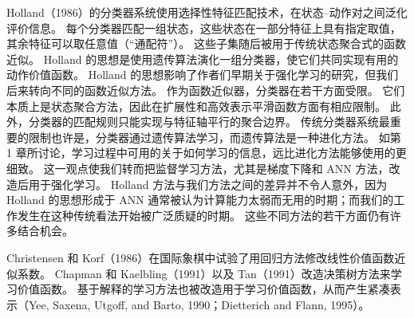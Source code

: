 \documentclass[UTF8, 12pt, fontset=fandol, oneside]{ctexart}
\begin{document}
Holland（1986）的分类器系统使用选择性特征匹配技术，在状态--动作对之间泛化评价信息。
每个分类器匹配一组状态，这些状态在一部分特征上具有指定取值，其余特征可以取任意值（“通配符”）。
这些子集随后被用于传统状态聚合式的函数近似。
Holland 的思想是使用遗传算法演化一组分类器，使它们共同实现有用的动作价值函数。
Holland 的思想影响了作者们早期关于强化学习的研究，但我们后来转向不同的函数近似方法。
作为函数近似器，分类器在若干方面受限。
它们本质上是状态聚合方法，因此在扩展性和高效表示平滑函数方面有相应限制。
此外，分类器的匹配规则只能实现与特征轴平行的聚合边界。
传统分类器系统最重要的限制也许是，分类器通过遗传算法学习，而遗传算法是一种进化方法。
如第 1 章所讨论，学习过程中可用的关于如何学习的信息，远比进化方法能够使用的更细致。
这一观点使我们转而把监督学习方法，尤其是梯度下降和 ANN 方法，改造后用于强化学习。
Holland 方法与我们方法之间的差异并不令人意外，因为 Holland 的思想形成于 ANN 通常被认为计算能力太弱而无用的时期；而我们的工作发生在这种传统看法开始被广泛质疑的时期。
这些不同方法的若干方面仍有许多结合机会。

Christensen 和 Korf（1986）在国际象棋中试验了用回归方法修改线性价值函数近似系数。
Chapman 和 Kaelbling（1991）以及 Tan（1991）改造决策树方法来学习价值函数。
基于解释的学习方法也被改造用于学习价值函数，从而产生紧凑表示（Yee, Saxena, Utgoff, and Barto, 1990；Dietterich and Flann, 1995）。
\end{document}
